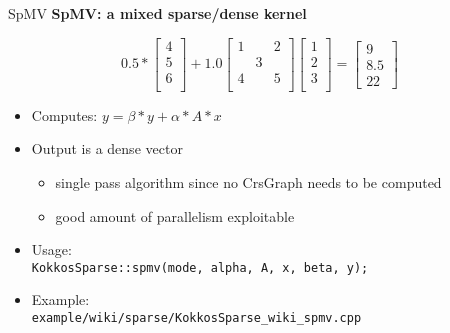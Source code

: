 \begin{frame}[fragile]{SpMV}
  \textbf{SpMV: a mixed sparse/dense kernel}

  \begin{equation*}
  0.5*\begin{bmatrix}
    4\\ 5\\ 6\\
  \end{bmatrix}+1.0
  \begin{bmatrix}
    1 & & 2 \\
    & 3 & \\
    4 & & 5 \\
  \end{bmatrix}
  \begin{bmatrix}
    1\\ 2\\ 3\\
  \end{bmatrix}
  =\begin{bmatrix}
  9 \\ 8.5 \\ 22
  \end{bmatrix}
  \end{equation*}
  
  \begin{itemize}
  \item Computes: $y = \beta*y + \alpha*A*x$
  \item Output is a dense vector
    \begin{itemize}
    \item single pass algorithm since no CrsGraph needs to be computed
    \item good amount of parallelism exploitable
    \end{itemize}
  \item Usage:  \\ \hspace{1em}\texttt{KokkosSparse::spmv(mode, alpha, A, x, beta, y);}
  \item Example:\\ \hspace{1em}\texttt{example/wiki/sparse/KokkosSparse\_wiki\_spmv.cpp}
  \end{itemize}
\end{frame}

